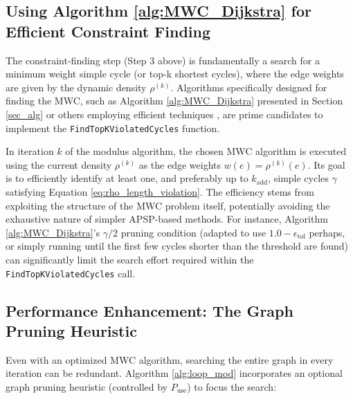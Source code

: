 \documentclass{article}
\begin{document}
\subsection{Using Algorithm \ref{alg:MWC_Dijkstra} for Efficient Constraint Finding}
\label{subsec:algo1_for_constraints} %

The constraint-finding step (Step 3 above) is fundamentally a search for a minimum weight simple cycle (or top-k shortest cycles), where the edge weights are given by the dynamic density $\rho^{(k)}$. Algorithms specifically designed for finding the MWC, such as Algorithm \ref{alg:MWC_Dijkstra} presented in Section \ref{sec_alg} or others employing efficient techniques \cite{itai1978finding, orlin2016nm}, are prime candidates to implement the \texttt{FindTopKViolatedCycles} function.

In iteration $k$ of the modulus algorithm, the chosen MWC algorithm is executed using the current density $\rho^{(k)}$ as the edge weights $w(e) = \rho^{(k)}(e)$. Its goal is to efficiently identify at least one, and preferably up to $k_{\text{add}}$, simple cycles $\gamma$ satisfying Equation \eqref{eq:rho_length_violation}. The efficiency stems from exploiting the structure of the MWC problem itself, potentially avoiding the exhaustive nature of simpler APSP-based methods. For instance, Algorithm \ref{alg:MWC_Dijkstra}'s $\gamma/2$ pruning condition (adapted to use $1.0 - \epsilon_{\text{tol}}$ perhaps, or simply running until the first few cycles shorter than the threshold are found) can significantly limit the search effort required within the \texttt{FindTopKViolatedCycles} call.

\subsection{Performance Enhancement: The Graph Pruning Heuristic}
\label{subsec:pruning_heuristic} %

Even with an optimized MWC algorithm, searching the entire graph in every iteration can be redundant. Algorithm \ref{alg:loop_mod} incorporates an optional graph pruning heuristic (controlled by $P_{\text{use}}$) to focus the search:
\end{document}
